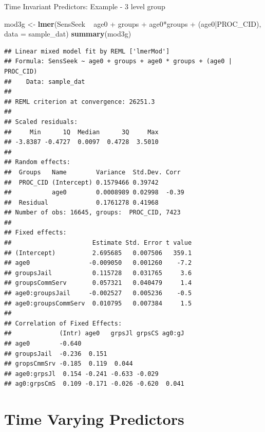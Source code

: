 \documentclass[ignorenonframetext,]{beamer}
\newenvironment{Shaded}{\begin{snugshade}}{\end{snugshade}}
\newcommand{\KeywordTok}[1]{\textcolor[rgb]{0.13,0.29,0.53}{\textbf{{#1}}}}
\newcommand{\DataTypeTok}[1]{\textcolor[rgb]{0.13,0.29,0.53}{{#1}}}
\newcommand{\StringTok}[1]{\textcolor[rgb]{0.31,0.60,0.02}{{#1}}}
\newcommand{\NormalTok}[1]{{#1}}
\begin{document}
\begin{frame}[fragile]{Time Invariant Predictors: Example - 3 level
group}

\small

\begin{Shaded}
\begin{Highlighting}[]
\NormalTok{mod3g <-}\StringTok{ }\KeywordTok{lmer}\NormalTok{(SensSeek ~}\StringTok{ }\NormalTok{age0 +}\StringTok{ }\NormalTok{groups +}\StringTok{ }\NormalTok{age0*groups +}\StringTok{ }
\StringTok{                }\NormalTok{(age0|PROC_CID), }\DataTypeTok{data =} \NormalTok{sample_dat)}
\KeywordTok{summary}\NormalTok{(mod3g)}
\end{Highlighting}
\end{Shaded}

\tiny

\begin{verbatim}
## Linear mixed model fit by REML ['lmerMod']
## Formula: SensSeek ~ age0 + groups + age0 * groups + (age0 | PROC_CID)
##    Data: sample_dat
## 
## REML criterion at convergence: 26251.3
## 
## Scaled residuals: 
##     Min      1Q  Median      3Q     Max 
## -3.8387 -0.4727  0.0097  0.4728  3.5010 
## 
## Random effects:
##  Groups   Name        Variance  Std.Dev. Corr 
##  PROC_CID (Intercept) 0.1579466 0.39742       
##           age0        0.0008989 0.02998  -0.39
##  Residual             0.1761278 0.41968       
## Number of obs: 16645, groups:  PROC_CID, 7423
## 
## Fixed effects:
##                      Estimate Std. Error t value
## (Intercept)          2.695685   0.007506   359.1
## age0                -0.009050   0.001260    -7.2
## groupsJail           0.115728   0.031765     3.6
## groupsCommServ       0.057321   0.040479     1.4
## age0:groupsJail     -0.002527   0.005236    -0.5
## age0:groupsCommServ  0.010795   0.007384     1.5
## 
## Correlation of Fixed Effects:
##             (Intr) age0   grpsJl grpsCS ag0:gJ
## age0        -0.640                            
## groupsJail  -0.236  0.151                     
## gropsCmmSrv -0.185  0.119  0.044              
## age0:grpsJl  0.154 -0.241 -0.633 -0.029       
## ag0:grpsCmS  0.109 -0.171 -0.026 -0.620  0.041
\end{verbatim}

\normalsize

\end{frame}

\section{Time Varying Predictors}\label{time-varying-predictors}
\end{document}
